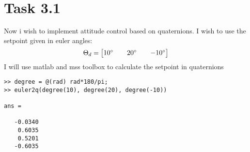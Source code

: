\documentclass[11pt]{article}
\begin{document}
\section*{Task 3.1}
Now i wish to implement attitude control based on quaternions. I wish to use the setpoint given in euler angles:
\[\Theta_d = \begin{bmatrix} 10\degree && 20\degree && -10\degree \end{bmatrix} \]
I will use matlab and mss toolbox to calculate the setpoint in quaternions
\begin{lstlisting}[frame=single]
>> degree = @(rad) rad*180/pi;
>> euler2q(degree(10), degree(20), degree(-10))

ans =

   -0.0340
    0.6035
    0.5201
   -0.6035
\end{lstlisting}
\end{document}
